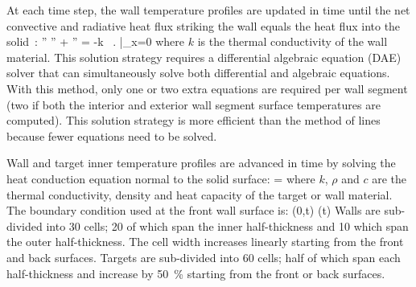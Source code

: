 \documentclass[12pt,twoside]{book}
\begin{document}
At each time step, the wall temperature profiles are updated in time until the net convective and radiative heat flux striking the wall equals the heat flux into the solid~\cite{Moss:1992}:
\be
   \dq'' \equiv \dqr'' + \dqc'' = -k \, \left.  \right|_{x=0} \label{eq:net_fluxes}
\ee
where $k$ is the thermal conductivity of the wall material.  This solution strategy requires a differential algebraic equation (DAE) solver that can simultaneously solve both differential and algebraic equations.  With this method, only one or two extra equations are required per wall segment (two if both the interior and exterior wall segment surface temperatures are computed).  This solution strategy is more efficient than the method of lines because fewer equations need to be solved.

Wall and target inner temperature profiles are advanced in time by solving the heat conduction equation normal to the solid surface:
\be {} = 
\label{eq:Target_PDE} \ee
where $k$, $\rho$ and $c$ are the thermal conductivity, density and heat capacity of the target or wall material. The boundary condition used at the front wall surface is:
\be
   \Ts(0,t) \equiv \Tw(t)
\ee
Walls are sub-divided into 30 cells; 20 of which span the inner half-thickness and 10 which span the outer half-thickness. The cell width increases linearly starting from the front and back surfaces. Targets are sub-divided into 60 cells; half of which span each half-thickness and increase by 50~\% starting from the front or back surfaces.

\newcommand{\Dt}{\Delta t}
\newcommand{\Dr}{\Delta r}
\newcommand{\Tipo}{T_{i+1}^{n+1}}
\newcommand{\TTi}{T_{i}^{n+1}}
\newcommand{\Timo}{T_{i-1}^{n+1}}
\end{document}
